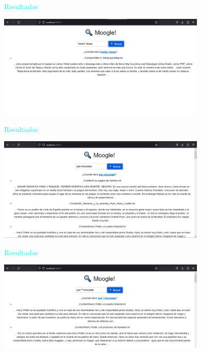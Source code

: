 \documentclass[a4paper, 12pt]{beamer}
\begin{document}
\begin{frame}{\textcolor{cyan}{Resultados}}
    \begin{center}
        \includegraphics[width=10cm]{images/image 5.png}
      \end{center}
    
\end{frame}

\begin{frame}{\textcolor{cyan}{Resultados}}
    \begin{center}
        \includegraphics[width=10cm]{images/image 6.png}
      \end{center}
    
\end{frame}

\begin{frame}{\textcolor{cyan}{Resultados}}
    \begin{center}
        \includegraphics[width=10cm]{images/image 7.png}
      \end{center}
    
\end{frame}
\end{document}
